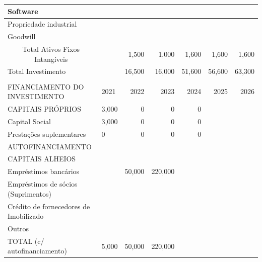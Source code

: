 \documentclass[11pt]{article}
\begin{document}
\begin{center}
\begin{tabular}{|l|l|r|r|r|r|r|}
			Software                                             &      &                           &                           &                           &                           &                           \\ \hline
			Propriedade industrial                               &      &                           &                           &                           &                           &                           \\ \hline
			Goodwill                                             &      &                           &                           &                           &                           &                           \\ \hline
			\multicolumn{1}{|c|}{Total Ativos Fixos Intangíveis} &      & 1,500                     & 1,000                     & 1,600                     & 1,600                     & 1,600                     \\ \hline
			Total Investimento                                   &      & 16,500                    & 16,000                    & 51,600                    & 56,600                    & 63,300                    \\ \hline
		\multicolumn{1}{l}{} & \multicolumn{1}{l}{} & \multicolumn{1}{l}{} & \multicolumn{1}{l}{} & \multicolumn{1}{l}{} & \multicolumn{1}{l}{} & \multicolumn{1}{l}{} \\ \hline
			FINANCIAMENTO DO INVESTIMENTO          & 2021 & 2022 & 2023 & 2024 & 2025 & 2026 \\ \hline
			CAPITAIS PRÓPRIOS                      & 3,000 & 0    & 0    & 0 & &   \\ \hline 
			Capital Social                         & 3,000 & 0    & 0    & 0  & & \\ \hline
			Prestações suplementares               & 0    & 0    & 0    & 0  & &  \\ \hline
			AUTOFINANCIAMENTO                      &      &      &      &   & &  \\ \hline
			CAPITAIS ALHEIOS                       &      &      &      &   & &  \\ \hline
			Empréstimos bancários                  &      &50,000& 220,000&   & &  \\ \hline
			Empréstimos de sócios (Suprimentos)    &      &      &       &    & &   \\ \hline
			Crédito de fornecedores de Imobilizado &      &      &      &    & &   \\ \hline
			Outros                                 &      &      &      &    & &   \\ \hline
			TOTAL (c/ autofinanciamento)           & 5,000 & 50,000     & 220,000    & &  & \\ \hline
		\end{tabular}
	\end{center}
\end{document}
